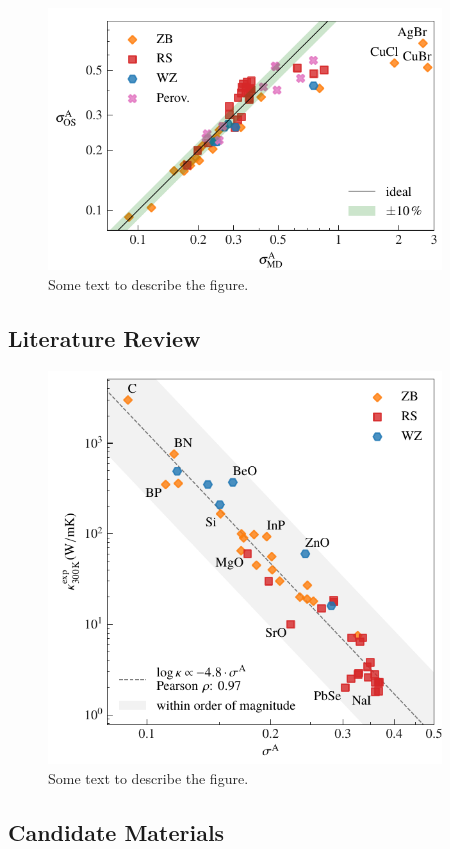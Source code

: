 \begin{figure}
	\includegraphics[width=4.1in]{./data/plots/anharmonicity/8_screening/sigma_os_md.pdf}
	\caption{
		Some text to describe the figure.
	}
\end{figure}

\subsection{Literature Review}


\begin{figure}
	\includegraphics[width=4.1in]{./data/plots/anharmonicity/9_kappa/sigma_vs_kappa.pdf}
	\caption{
		Some text to describe the figure.
	}
\end{figure}



\subsection{Candidate Materials}